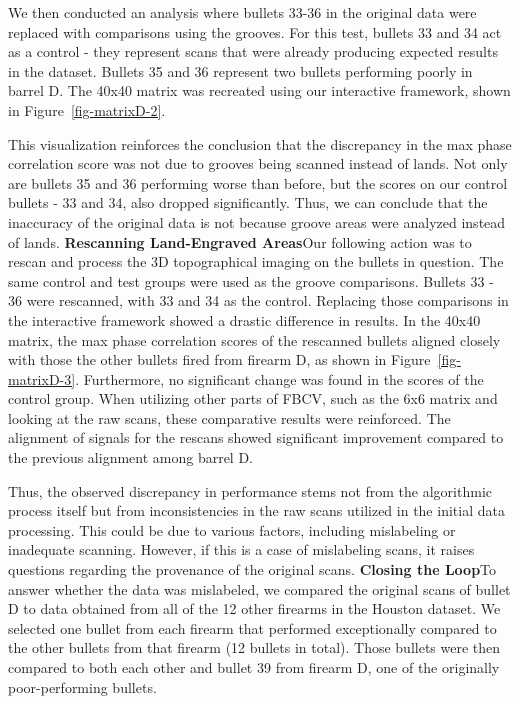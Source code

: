 \documentclass[
  number,
  preprint,
  5p,
  twocolumn]{elsarticle}
\newcommand{\thetool}{FBCV}
\begin{document}
We then conducted an analysis where bullets 33-36 in the original data
were replaced with comparisons using the grooves. For this test, bullets
33 and 34 act as a control - they represent scans that were already
producing expected results in the dataset. Bullets 35 and 36 represent
two bullets performing poorly in barrel D. The 40x40 matrix was
recreated using our interactive framework, shown in
Figure~\ref{fig-matrixD-2}.

This visualization reinforces the conclusion that the discrepancy in the
max phase correlation score was not due to grooves being scanned instead
of lands. Not only are bullets 35 and 36 performing worse than before,
but the scores on our control bullets - 33 and 34, also dropped
significantly. Thus, we can conclude that the inaccuracy of the original
data is not because groove areas were analyzed instead of lands.
\hfill\newline\noindent \textbf{Rescanning Land-Engraved
Areas}\hfill\newline Our following action was to rescan and process the
3D topographical imaging on the bullets in question. The same control
and test groups were used as the groove comparisons. Bullets 33 - 36
were rescanned, with 33 and 34 as the control. Replacing those
comparisons in the interactive framework showed a drastic difference in
results. In the 40x40 matrix, the max phase correlation scores of the
rescanned bullets aligned closely with those the other bullets fired
from firearm D, as shown in Figure~\ref{fig-matrixD-3}. Furthermore, no
significant change was found in the scores of the control group. When
utilizing other parts of \thetool, such as the 6x6 matrix and looking at
the raw scans, these comparative results were reinforced. The alignment
of signals for the rescans showed significant improvement compared to
the previous alignment among barrel D.

Thus, the observed discrepancy in performance stems not from the
algorithmic process itself but from inconsistencies in the raw scans
utilized in the initial data processing. This could be due to various
factors, including mislabeling or inadequate scanning. However, if this
is a case of mislabeling scans, it raises questions regarding the
provenance of the original scans. \hfill\newline\noindent
\textbf{Closing the Loop}\hfill\newline To answer whether the data was
mislabeled, we compared the original scans of bullet D to data obtained
from all of the 12 other firearms in the Houston dataset. We selected
one bullet from each firearm that performed exceptionally compared to
the other bullets from that firearm (12 bullets in total). Those bullets
were then compared to both each other and bullet 39 from firearm D, one
of the originally poor-performing bullets.
\end{document}

